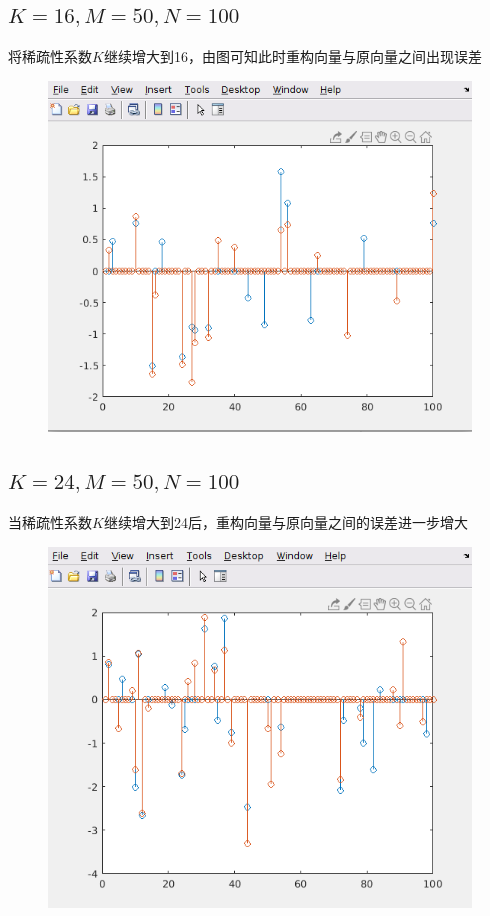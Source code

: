 \documentclass{article}
\begin{document}
\subsection{$ K=16,M=50,N=100 $}
将稀疏性系数$ K $继续增大到16，由图可知此时重构向量与原向量之间出现误差
\begin{figure}[H]
	\centering
	\includegraphics[scale=0.6]{k16.png}
\end{figure}

\subsection{$ K=24,M=50,N=100 $}
当稀疏性系数$ K $继续增大到24后，重构向量与原向量之间的误差进一步增大
\begin{figure}[H]
	\centering
	\includegraphics[scale=0.6]{k24.png}
\end{figure}
\end{document}
